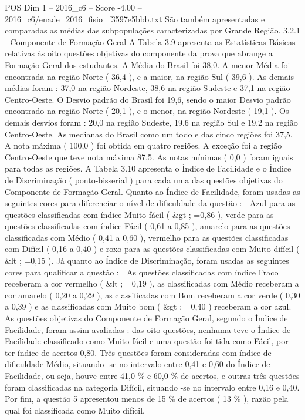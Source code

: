 \begin{textsample}{POS Dim 1 – 2016\_c6 – Score -4.00 – 2016\_c6/enade\_2016\_fisio\_f3597e5bbb.txt}
São também apresentadas e comparadas as médias das subpopulações caracterizadas por Grande Região. 3.2.1 - Componente de Formação Geral A Tabela 3.9 apresenta as Estatísticas Básicas relativas às oito questões objetivas do componente da prova que abrange a Formação Geral dos estudantes.
A Média do Brasil foi 38,0.
A menor Média foi encontrada na região Norte ( 36,4 ), e a maior, na região Sul ( 39,6 ).
As demais médias foram : 37,0 na região Nordeste, 38,6 na região Sudeste e 37,1 na região Centro-Oeste.
O Desvio padrão do Brasil foi 19,6, sendo o maior Desvio padrão encontrado na região Norte ( 20,1 ), e o menor, na região Nordeste ( 19,1 ).
Os demais desvios foram : 20,0 na região Sudeste, 19,6 na região Sul e 19,2 na região Centro-Oeste.
As medianas do Brasil como um todo e das cinco regiões foi 37,5.
A nota máxima ( 100,0 ) foi obtida em quatro regiões.
A exceção foi a região Centro-Oeste que teve nota máxima 87,5.
As notas mínimas ( 0,0 ) foram iguais para todas as regiões.
A Tabela 3.10 apresenta o Índice de Facilidade e o Índice de Discriminação ( ponto-bisserial ) para cada uma das questões objetivas do Componente de Formação Geral.
Quanto ao Índice de Facilidade, foram usadas as seguintes cores para diferenciar o nível de dificuldade da questão :  Azul para as questões classificadas com índice Muito fácil ( \&gt ; =0,86 ), verde para as questões classificadas com índice Fácil ( 0,61 a 0,85 ), amarelo para as questões classificadas com Médio ( 0,41 a 0,60 ), vermelho para as questões classificadas com Difícil ( 0,16 a 0,40 ) e roxo para as questões classificadas com Muito difícil ( \&lt ; =0,15 ).
Já quanto ao Índice de Discriminação, foram usadas as seguintes cores para qualificar a questão :  As questões classificadas com índice Fraco receberam a cor vermelho ( \&lt ; =0,19 ), as classificadas com Médio receberam a cor amarelo ( 0,20 a 0,29 ), as classificadas com Bom receberam a cor verde ( 0,30 a 0,39 ) e as classificadas com Muito bom ( \&gt ; =0,40 ) receberam a cor azul.
As questões objetivas do Componente de Formação Geral, segundo o Índice de Facilidade, foram assim avaliadas : das oito questões, nenhuma teve o Índice de Facilidade classificado como Muito fácil e uma questão foi tida como Fácil, por ter índice de acertos 0,80.
Três questões foram consideradas com índice de dificuldade Médio, situando -se no intervalo entre 0,41 e 0,60 do Índice de Facilidade, ou seja, houve entre 41,0 \% e 60,0 \% de acertos, e outras três questões foram classificadas na categoria Difícil, situando -se no intervalo entre 0,16 e 0,40.
Por fim, a questão 5 apresentou menos de 15 \% de acertos ( 13 \% ), razão pela qual foi classificada como Muito difícil.

\end{textsample}

